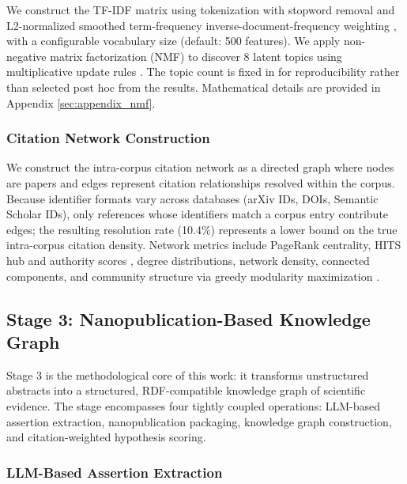 \documentclass[
  english,
]{article}
\begin{document}
We construct the TF-IDF matrix using tokenization with stopword removal
and L2-normalized smoothed term-frequency inverse-document-frequency
weighting \citep{salton1975vector}, with a configurable vocabulary size
(default: 500 features). We apply non-negative matrix factorization
(NMF) to discover \(8\) latent topics using multiplicative update rules
\citep{lee1999nmf}. The topic count is fixed in
 for reproducibility rather than selected
post hoc from the results. Mathematical details are provided in Appendix
\ref{sec:appendix_nmf}.

\subsubsection{Citation Network
Construction}\label{citation-network-construction}

We construct the intra-corpus citation network as a directed graph where
nodes are papers and edges represent citation relationships resolved
within the corpus. Because identifier formats vary across databases
(arXiv IDs, DOIs, Semantic Scholar IDs), only references whose
identifiers match a corpus entry contribute edges; the resulting
resolution rate (10.4\%) represents a lower bound on the true
intra-corpus citation density. Network metrics include PageRank
centrality, HITS hub and authority scores
\citep{kleinberg1999authoritative}, degree distributions, network
density, connected components, and community structure via greedy
modularity maximization \citep{clauset2004finding}.

\newpage

\subsection{Stage 3: Nanopublication-Based Knowledge
Graph}\label{sec:methods_kg}

Stage 3 is the methodological core of this work: it transforms
unstructured abstracts into a structured, RDF-compatible knowledge graph
of scientific evidence. The stage encompasses four tightly coupled
operations: LLM-based assertion extraction, nanopublication packaging,
knowledge graph construction, and citation-weighted hypothesis scoring.

\subsubsection{LLM-Based Assertion
Extraction}\label{llm-based-assertion-extraction}
\end{document}
